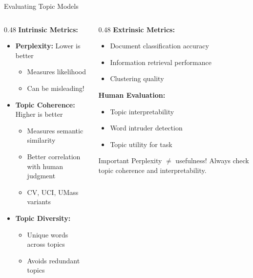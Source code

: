 \documentclass[aspectratio=169]{beamer}
\begin{document}
\begin{frame}[shrink=10]{Evaluating Topic Models 📏}
\begin{columns}[T]
\begin{column}{0.48\textwidth}
\textbf{Intrinsic Metrics:}
\begin{itemize}\setlength{\itemsep}{0pt}
    \item \textbf{Perplexity:} Lower is better
    \begin{itemize}\setlength{\itemsep}{0pt}
        \item Measures likelihood
        \item Can be misleading!
    \end{itemize}
    \item \textbf{Topic Coherence:} Higher is better
    \begin{itemize}\setlength{\itemsep}{0pt}
        \item Measures semantic similarity
        \item Better correlation with human judgment
        \item CV, UCI, UMass variants
    \end{itemize}
    \item \textbf{Topic Diversity:}
    \begin{itemize}\setlength{\itemsep}{0pt}
        \item Unique words across topics
        \item Avoids redundant topics
    \end{itemize}
\end{itemize}
\end{column}

\begin{column}{0.48\textwidth}
\textbf{Extrinsic Metrics:}
\begin{itemize}\setlength{\itemsep}{0pt}
    \item Document classification accuracy
    \item Information retrieval performance
    \item Clustering quality
\end{itemize}

\vspace{1em}
\textbf{Human Evaluation:}
\begin{itemize}\setlength{\itemsep}{0pt}
    \item Topic interpretability
    \item Word intruder detection
    \item Topic utility for task
\end{itemize}

\vspace{1em}
\begin{alertblock}{Important}
Perplexity $\neq$ usefulness!
Always check topic coherence and interpretability.
\end{alertblock}
\end{column}
\end{columns}
\end{frame}
\end{document}
